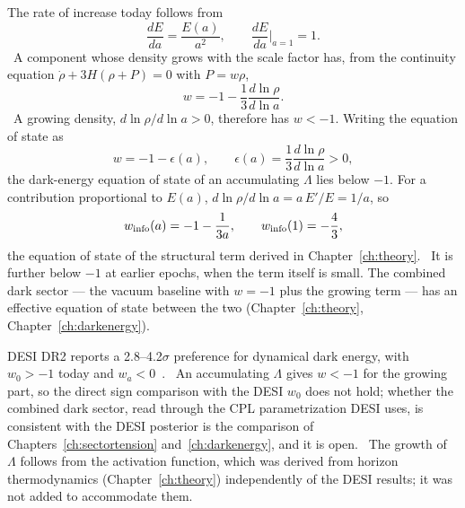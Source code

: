 The rate of increase today follows from
\begin{equation}\frac{dE}{da}=\frac{E(a)}{a^2},\qquad \frac{dE}{da}\Big|_{a=1}=1 .\label{eq:lh_dE}\end{equation}
\derived\ A component whose density grows with the scale factor has, from the continuity equation $\dot\rho+3H(\rho+P)=0$ with
$P=w\rho$,
\begin{equation}w=-1-\frac13\frac{d\ln\rho}{d\ln a}.\label{eq:lh_w}\end{equation}
\derived\ A growing density, $d\ln\rho/d\ln a>0$, therefore has $w<-1$. Writing the equation of state as
\begin{equation}w=-1-\epsilon(a),\qquad \epsilon(a)=\frac13\frac{d\ln\rho}{d\ln a}>0,\label{eq:lh_eps}\end{equation}
the dark-energy equation of state of an accumulating $\Lambda$ lies below $-1$. For a contribution proportional to $E(a)$,
$d\ln\rho/d\ln a=a\,E'/E=1/a$, so
\begin{equation}w_{\rm info}(a)=-1-\frac{1}{3a},\qquad w_{\rm info}(1)=-\frac43,\label{eq:lh_winfo}\end{equation}
the equation of state of the structural term derived in Chapter~\ref{ch:theory}. \derived\ It is further below $-1$ at earlier epochs,
when the term itself is small. The combined dark sector --- the vacuum baseline with $w=-1$ plus the growing term --- has an effective
equation of state between the two (Chapter~\ref{ch:theory}, Chapter~\ref{ch:darkenergy}). \calc

DESI DR2 reports a 2.8--4.2$\sigma$ preference for dynamical dark energy, with $w_0>-1$ today and $w_a<0$~\cite{DESI2025}. \observed\ An
accumulating $\Lambda$ gives $w<-1$ for the growing part, so the direct sign comparison with the DESI $w_0$ does not hold; whether the
combined dark sector, read through the CPL parametrization DESI uses, is consistent with the DESI posterior is the comparison of
Chapters~\ref{ch:sectortension} and~\ref{ch:darkenergy}, and it is open. \openprob\ The growth of $\Lambda$ follows from the activation
function, which was derived from horizon thermodynamics (Chapter~\ref{ch:theory}) independently of the DESI results; it was not added to
accommodate them.

